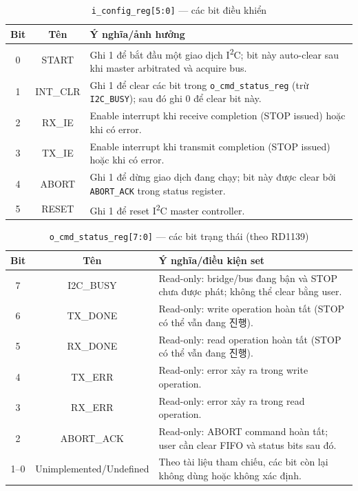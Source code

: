 \begin{table}[H]
    \centering
    \caption{\texttt{i\_config\_reg[5:0]} --- các bit điều khiển}
    \label{tab:config_reg_bits}
    \begin{tabularx}{\textwidth}{|c|c|X|}
        \hline
        \textbf{Bit} & \textbf{Tên} & \textbf{Ý nghĩa/ảnh hưởng} \\
        \hline
        0 & START & Ghi 1 để bắt đầu một giao dịch I\textsuperscript{2}C; bit này auto-clear sau khi master arbitrated và acquire bus. \\
        \hline
        1 & INT\_CLR & Ghi 1 để clear các bit trong \texttt{o\_cmd\_status\_reg} (trừ \texttt{I2C\_BUSY}); sau đó ghi 0 để clear bit này. \\
        \hline
        2 & RX\_IE & Enable interrupt khi receive completion (STOP issued) hoặc khi có error. \\
        \hline
        3 & TX\_IE & Enable interrupt khi transmit completion (STOP issued) hoặc khi có error. \\
        \hline
        4 & ABORT & Ghi 1 để dừng giao dịch đang chạy; bit này được clear bởi \texttt{ABORT\_ACK} trong status register. \\
        \hline
        5 & RESET & Ghi 1 để reset I\textsuperscript{2}C master controller. \\
        \hline
    \end{tabularx}
\end{table}

\begin{table}[H]
    \centering
    \caption{\texttt{o\_cmd\_status\_reg[7:0]} --- các bit trạng thái (theo RD1139)}
    \label{tab:cmd_status_bits}
    \begin{tabularx}{\textwidth}{|c|c|X|}
        \hline
        \textbf{Bit} & \textbf{Tên} & \textbf{Ý nghĩa/điều kiện set} \\
        \hline
        7 & I2C\_BUSY & Read-only: bridge/bus đang bận và STOP chưa được phát; không thể clear bằng user. \\
        \hline
        6 & TX\_DONE & Read-only: write operation hoàn tất (STOP có thể vẫn đang 진행). \\
        \hline
        5 & RX\_DONE & Read-only: read operation hoàn tất (STOP có thể vẫn đang 진행). \\
        \hline
        4 & TX\_ERR & Read-only: error xảy ra trong write operation. \\
        \hline
        3 & RX\_ERR & Read-only: error xảy ra trong read operation. \\
        \hline
        2 & ABORT\_ACK & Read-only: ABORT command hoàn tất; user cần clear FIFO và status bits sau đó. \\
        \hline
        1--0 & Unimplemented/Undefined & Theo tài liệu tham chiếu, các bit còn lại không dùng hoặc không xác định. \\
        \hline
    \end{tabularx}
\end{table}


